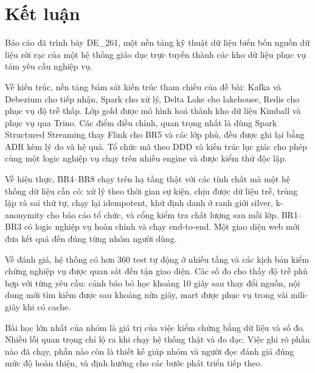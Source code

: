 \chapter{Kết luận}
\label{chap:conclusion}

Báo cáo đã trình bày DE\_261, một nền tảng kỹ thuật dữ liệu biến bốn nguồn dữ liệu rời rạc của một hệ thống giáo dục trực tuyến thành các kho dữ liệu phục vụ tám yêu cầu nghiệp vụ.

Về kiến trúc, nền tảng bám sát kiến trúc tham chiếu của đề bài: Kafka và Debezium cho tiếp nhận, Spark cho xử lý, Delta Lake cho lakehouse, Redis cho phục vụ độ trễ thấp. Lớp gold được mô hình hoá thành kho dữ liệu Kimball và phục vụ qua Trino. Các điểm điều chỉnh, quan trọng nhất là dùng Spark Structured Streaming thay Flink cho BR5 và các lớp phủ, đều được ghi lại bằng ADR kèm lý do và hệ quả. Tổ chức mã theo DDD và kiến trúc lục giác cho phép cùng một logic nghiệp vụ chạy trên nhiều engine và được kiểm thử độc lập.

Về hiện thực, BR4--BR8 chạy trên hạ tầng thật với các tính chất mà một hệ thống dữ liệu cần có: xử lý theo thời gian sự kiện, chịu được dữ liệu trễ, trùng lặp và sai thứ tự, chạy lại idempotent, khử định danh ở ranh giới silver, k-anonymity cho báo cáo tổ chức, và cổng kiểm tra chất lượng sau mỗi lớp. BR1--BR3 có logic nghiệp vụ hoàn chỉnh và chạy end-to-end. Một giao diện web mới đưa kết quả đến đúng từng nhóm người dùng.

Về đánh giá, hệ thống có hơn 360 test tự động ở nhiều tầng và các kịch bản kiểm chứng nghiệp vụ được quan sát đến tận giao diện. Các số đo cho thấy độ trễ phù hợp với từng yêu cầu: cảnh báo bỏ học khoảng 10 giây sau thay đổi nguồn, nội dung mới tìm kiếm được sau khoảng nửa giây, mart được phục vụ trong vài mili-giây khi có cache.

Bài học lớn nhất của nhóm là giá trị của việc kiểm chứng bằng dữ liệu và số đo. Nhiều lỗi quan trọng chỉ lộ ra khi chạy hệ thống thật và đo đạc. Việc ghi rõ phần nào đã chạy, phần nào còn là thiết kế giúp nhóm và người đọc đánh giá đúng mức độ hoàn thiện, và định hướng cho các bước phát triển tiếp theo.
